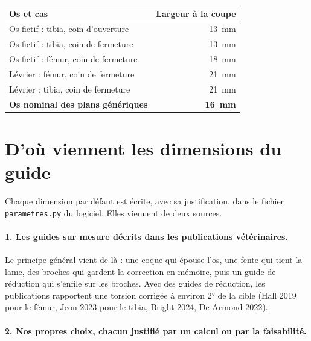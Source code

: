 \documentclass[11pt,a4paper]{article}
\begin{document}
\begin{center}
  \captionsetup{type=table}
  \caption{Largeur de l'os au niveau de la coupe, mesurée sur les guides de démonstration (longueur de la fente moins
  2~mm).}
  \label{tab:largeurs}
  \begin{tabularx}{0.82\textwidth}{@{}Xr@{}}
  \toprule
  \textbf{Os et cas} & \textbf{Largeur à la coupe} \\ \midrule
  Os fictif : tibia, coin d'ouverture & 13~mm \\
  Os fictif : tibia, coin de fermeture & 13~mm \\
  Os fictif : fémur, coin de fermeture & 18~mm \\
  Lévrier : fémur, coin de fermeture & 21~mm \\
  Lévrier : tibia, coin de fermeture & 21~mm \\
  \textbf{Os nominal des plans génériques} & \textbf{16~mm} \\
  \bottomrule
  \end{tabularx}
\end{center}

\section{D'où viennent les dimensions du guide}

Chaque dimension par défaut est écrite, avec sa justification, dans le fichier \texttt{parametres.py} du logiciel.
Elles viennent de deux sources.

\paragraph{1. Les guides sur mesure décrits dans les publications vétérinaires.} Le principe général vient de là :
une coque qui épouse l'os, une fente qui tient la lame, des broches qui gardent la correction en mémoire, puis un guide
de réduction qui s'enfile sur les broches. Avec des guides de réduction, les publications rapportent une torsion
corrigée à environ 2° de la cible (Hall 2019 pour le fémur, Jeon 2023 pour le tibia, Bright 2024, De Armond 2022).

\paragraph{2. Nos propres choix, chacun justifié par un calcul ou par la faisabilité.}
\end{document}
